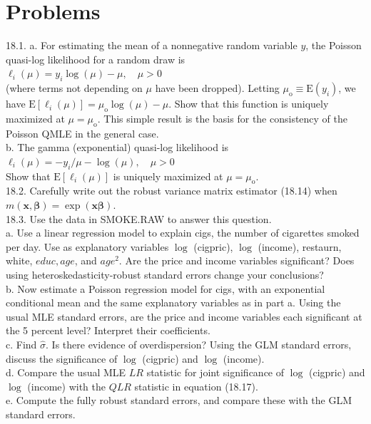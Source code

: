 \documentclass[10pt]{article}
\begin{document}
\section*{Problems}
18.1. a. For estimating the mean of a nonnegative random variable $y$, the Poisson quasi-log likelihood for a random draw is\\
$\ell_{i}(\mu)=y_{i} \log (\mu)-\mu, \quad \mu>0$\\
(where terms not depending on $\mu$ have been dropped). Letting $\mu_{\mathrm{o}} \equiv \mathrm{E}\left(y_{i}\right)$, we have $\mathrm{E}\left[\ell_{i}(\mu)\right]=\mu_{\mathrm{o}} \log (\mu)-\mu$. Show that this function is uniquely maximized at $\mu=\mu_{\mathrm{o}}$. This simple result is the basis for the consistency of the Poisson QMLE in the general case.\\
b. The gamma (exponential) quasi-log likelihood is\\
$\ell_{i}(\mu)=-y_{i} / \mu-\log (\mu), \quad \mu>0$\\
Show that $\mathrm{E}\left[\ell_{i}(\mu)\right]$ is uniquely maximized at $\mu=\mu_{\mathrm{o}}$.\\
18.2. Carefully write out the robust variance matrix estimator (18.14) when $m(\mathbf{x}, \boldsymbol{\beta})=\exp (\mathbf{x} \boldsymbol{\beta})$.\\
18.3. Use the data in SMOKE.RAW to answer this question.\\
a. Use a linear regression model to explain cigs, the number of cigarettes smoked per day. Use as explanatory variables $\log$ (cigpric), $\log$ (income), restaurn, white, $e d u c, a g e$, and $a g e^{2}$. Are the price and income variables significant? Does using heteroskedasticity-robust standard errors change your conclusions?\\
b. Now estimate a Poisson regression model for cigs, with an exponential conditional mean and the same explanatory variables as in part a. Using the usual MLE standard errors, are the price and income variables each significant at the 5 percent level? Interpret their coefficients.\\
c. Find $\hat{\sigma}$. Is there evidence of overdispersion? Using the GLM standard errors, discuss the significance of $\log$ (cigpric) and $\log$ (income).\\
d. Compare the usual MLE $L R$ statistic for joint significance of $\log$ (cigpric) and $\log$ (income) with the $Q L R$ statistic in equation (18.17).\\
e. Compute the fully robust standard errors, and compare these with the GLM standard errors.\\
\end{document}
